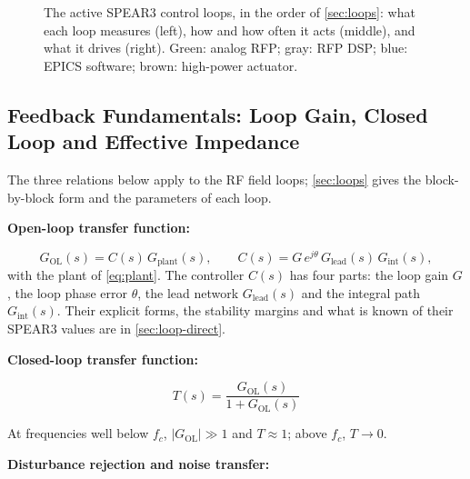 \begin{figure}[tp]
\centering
\begin{fitpicture}\end{fitpicture}
\caption[The SPEAR3 control loops]{The active SPEAR3 control loops, in the order of \cref{sec:loops}: what each loop measures (left), how and how often it acts (middle), and what it drives (right). Green: analog RFP; gray: RFP DSP; blue: EPICS software; brown: high-power actuator.}\label{fig:loop-architecture}
\end{figure}

\subsection{Feedback Fundamentals: Loop Gain, Closed Loop and Effective Impedance}\label{sec:arch-fundamentals}


The three relations below apply to the RF field loops; \cref{sec:loops} gives the block-by-block form and the parameters of each loop.

\textbf{Open-loop transfer function:}

\begin{equation}\label{eq:gol}
G_\text{OL}(s) = C(s)\,G_\text{plant}(s),
\qquad
C(s) = G\,e^{j\theta}\,G_\text{lead}(s)\,G_\text{int}(s),
\end{equation}
with the plant of \cref{eq:plant}. The controller \(C(s)\) has four parts: the loop gain \(G\), the loop phase error \(\theta\), the lead network \(G_\text{lead}(s)\) and the integral path \(G_\text{int}(s)\). Their explicit forms, the stability margins and what is known of their SPEAR3 values are in \cref{sec:loop-direct}.

\textbf{Closed-loop transfer function:}

\begin{equation}\label{eq:closed-loop}
T(s) = \frac{G_\text{OL}(s)}{1 + G_\text{OL}(s)}
\end{equation}

At frequencies well below \(f_c\), \(|G_\text{OL}| \gg 1\) and \(T \approx 1\); above \(f_c\), \(T \to 0\).

\textbf{Disturbance rejection and noise transfer:}

